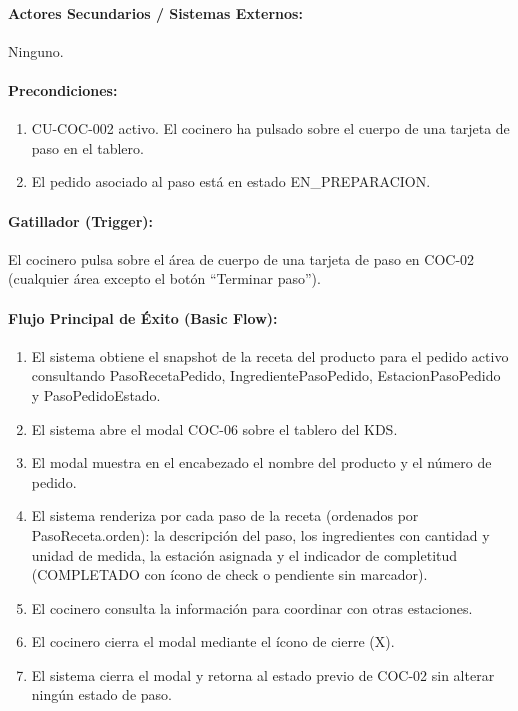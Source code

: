 \paragraph{Actores Secundarios / Sistemas Externos:} Ninguno.

\paragraph{Precondiciones:}
\begin{enumerate}
    \item[I.] CU-COC-002 activo. El cocinero ha pulsado sobre el cuerpo de una tarjeta de paso en el tablero.
    \item[II.] El pedido asociado al paso está en estado EN\_PREPARACION.
\end{enumerate}

\paragraph{Gatillador (Trigger):} El cocinero pulsa sobre el área de cuerpo de una tarjeta de paso en COC-02 (cualquier área excepto el botón ``Terminar paso'').

\paragraph{Flujo Principal de Éxito (Basic Flow):}
\begin{enumerate}
    \item[I.] El sistema obtiene el snapshot de la receta del producto para el pedido activo consultando PasoRecetaPedido, IngredientePasoPedido, EstacionPasoPedido y PasoPedidoEstado.
    \item[II.] El sistema abre el modal COC-06 sobre el tablero del KDS.
    \item[III.] El modal muestra en el encabezado el nombre del producto y el número de pedido.
    \item[IV.] El sistema renderiza por cada paso de la receta (ordenados por PasoReceta.orden): la descripción del paso, los ingredientes con cantidad y unidad de medida, la estación asignada y el indicador de completitud (COMPLETADO con ícono de check o pendiente sin marcador).
    \item[V.] El cocinero consulta la información para coordinar con otras estaciones.
    \item[VI.] El cocinero cierra el modal mediante el ícono de cierre (X).
    \item[VII.] El sistema cierra el modal y retorna al estado previo de COC-02 sin alterar ningún estado de paso.
\end{enumerate}

